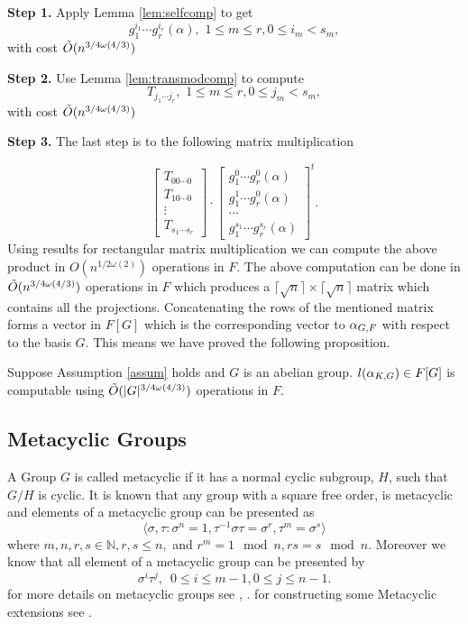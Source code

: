 \textbf{Step 1.} Apply Lemma \ref{lem:selfcomp} to get 
$$g_1^{i_1} \cdots g_r^{i_r}(\alpha), \,\, 1\leq m \leq r, 0\leq i_m < s_m,$$
with cost $\tilde{O}(n^{3/4 \omega(4/3)})$

\textbf{Step 2.} Use Lemma \ref{lem:transmodcomp} to compute 
$$T_{j_1\cdots j_r}, \,\, 1\leq m \leq r, 0 \leq j_m < s_m,$$
with cost $\tilde{O}(n^{3/4 \omega(4/3)})$

\textbf{Step 3.} The last step is to the following matrix multiplication

$$
\left[ \begin{array}{c}
T_{00\cdots 0}\\
\hline
T_{10\cdots 0}\\
\hline
\vdots\\
\hline
T_{s_1 \cdots s_r}
\end{array} \right]
\cdot
\left[\begin{array}{c}
g_1^{0}\cdots g_r^{0}(\alpha) \\
\hline
g_1^{1}\cdots g_r^{0}(\alpha) \\
\hline
\cdots \\
\hline
g_1^{s_1}\cdots g_r^{s_r}(\alpha)  
\end{array}\right]^t.
$$
Using results for rectangular matrix multiplication we can compute the above product in $O(n^{1/2\omega(2)})$ operations in $F$.
The above computation can be done in $\tilde{O}(n^{3/4 \omega(4/3)})$ operations in $F$ which produces a $\lceil \sqrt{n} \rceil \times \lceil
 \sqrt{n} \rceil$ matrix which contains all the projections. Concatenating the rows of the mentioned matrix forms a vector in
 $F[G]$ which is the corresponding vector to $\alpha_{G,F}$ with respect to the basis $G$. This means we have proved the following
 proposition.

\begin{proposition}
Suppose Assumption \ref{assum} holds and $G$ is an abelian group. $l(\alpha_{K,G}) \in F[G]$ is computable using $\tilde{O}(\vert G \vert ^{3/4 \omega(4/3)})$ 
operations in $F$.
\end{proposition}

\subsection{Metacyclic Groups}

A Group $G$ is called metacyclic if it has a normal cyclic subgroup, $H$, such that $G/H$ is cyclic. It is known that any group
with a square free order, is metacyclic and elements of a metacyclic group can be presented as 
\begin{equation}\label{eq:metacyclic}
\langle \sigma,\tau: \sigma^n = 1, \tau^{-1}\sigma \tau = \sigma^r, \tau ^m = \sigma^s \rangle
\end{equation}
where $m,n,r,s \in \mathbb{N}, r,s \leq n,$ and $r^m = 1 \mod n , rs = s \mod n$. Moreover we know that all element of a metacyclic
 group can be presented by $$\sigma^i \tau^j, \,\,\, 0\leq i \leq m-1, 0\leq j \leq n-1.$$ 
for more details on metacyclic groups see \cite[P.88, Proposition 1]{Johnson}, \cite[P.334]{Curtis}. for constructing some 
Metacyclic extensions see \cite{Kida}.

